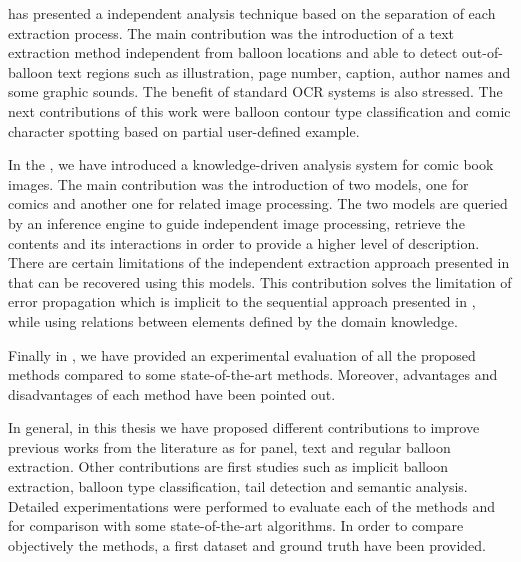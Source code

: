  has presented a independent analysis technique based on the separation of each extraction process.
The main contribution was the introduction of a text extraction method independent from balloon locations and able to detect out-of-balloon text regions such as illustration, page number, caption, author names and some graphic sounds.
The benefit of standard OCR systems is also stressed.
The next contributions of this work were balloon contour type classification and comic character spotting based on partial user-defined example.

In the , we have introduced a knowledge-driven analysis system for comic book images.
The main contribution was the introduction of two models, one for comics and another one for related image processing.
The two models are queried by an inference engine to guide independent image processing, retrieve the contents and its interactions in order to provide a higher level of description.
There are certain limitations of the independent extraction approach presented in  that can be recovered using this models.
This contribution solves the limitation of error propagation which is implicit to the sequential approach presented in , while using relations between elements defined by the domain knowledge.

Finally in , we have provided an experimental evaluation of all the proposed methods compared to some state-of-the-art methods.
Moreover, advantages and disadvantages of each method have been pointed out.

In general, in this thesis we have proposed different contributions to improve previous works from the literature as for panel, text and regular balloon extraction.
Other contributions are first studies such as implicit balloon extraction, balloon type classification, tail detection and semantic analysis.
Detailed experimentations were performed to evaluate each of the methods and for comparison with some state-of-the-art algorithms.
In order to compare objectively the methods, a first dataset and ground truth have been provided.

